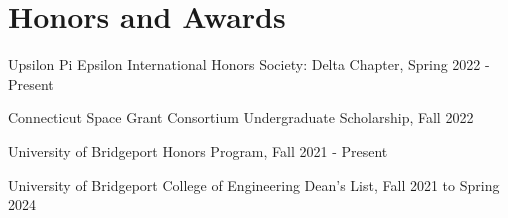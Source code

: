 \section{Honors and Awards}      
    \begin{onecolentry}
        \item Upsilon Pi Epsilon International Honors Society: Delta Chapter, Spring 2022 - Present
        \item Connecticut Space Grant Consortium Undergraduate Scholarship, Fall 2022  
        \item University of Bridgeport Honors Program, Fall 2021 - Present        
        \item University of Bridgeport College of Engineering Dean's List, Fall 2021 to Spring 2024
    \end{onecolentry}